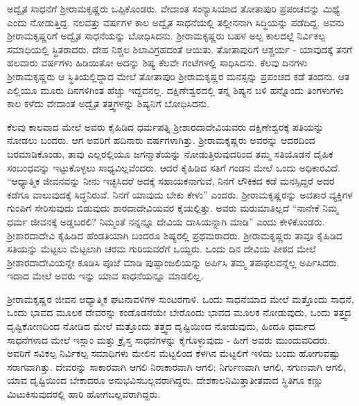 ಅದ್ವೈತ ಸಾಧನೆಗೆ ಶ‍್ರೀರಾಮಕೃಷ್ಣರು ಒಪ್ಪಿಕೊಂಡರು. ವೇದಾಂತ ಸಂನ್ಯಾಸಿಯಾದ ತೋತಾಪುರಿ ಪ್ರಪಂಚವನ್ನು ಮಿಥ್ಯೆ ಎಂದು ನೋಡುತ್ತಿದ್ದ. ನಲವತ್ತು ವರ್ಷಗಳ ಕಾಲ ಅದ್ವೈತ ಸಾಧನೆಯಲ್ಲಿ ತಲ್ಲೀನನಾಗಿ ಸಿದ್ಧಿಯನ್ನು ಪಡೆದಿದ್ದ. ಅವನು ಶ‍್ರೀರಾಮಕೃಷ್ಣರಿಗೆ ಅದ್ವೈತ ಸಾಧನೆಯನ್ನು ಬೋಧಿಸಿದನು. ಶ‍್ರೀರಾಮಕೃಷ್ಣರು ಬಹಳ ಅಲ್ಪ ಕಾಲದಲ್ಲೆ ನಿರ್ವಿಕಲ್ಪ ಸಮಾಧಿಯಲ್ಲಿ ಸ್ಥಿತರಾದರು. ದೇಹ ನಿಶ್ಚಲ ಶಿಲಾವಿಗ್ರಹದಂತೆ ಆಯಿತು. ತೋತಾಪುರಿಗೆ ಆಶ್ಚರ್ಯ - ಯಾವುದಕ್ಕೆ ತನಗೆ ಹಲವಾರು ವರ್ಷಗಳು ಹಿಡಿಯಿತೋ ಅದನ್ನು ಶಿಷ್ಯ ಕೆಲವೇ ಗಂಟೆಗಳಲ್ಲಿ ಸಾಧಿಸಿದನು. ಕೆಲವು ದಿನಗಳು ಶ‍್ರೀರಾಮಕೃಷ್ಣರು ಆ ಸ್ಥಿತಿಯಲ್ಲಿದ್ದಾದ ಮೇಲೆ ತೋತಾಪುರಿ ಶ‍್ರೀರಾಮಕೃಷ್ಣರ ಮನಸ್ಸನ್ನು ಪ್ರಪಂಚದ ಕಡೆ ತಂದನು. ಆತ ಎಲ್ಲಿಯೂ ಮೂರು ದಿನಗಳಿಗಿಂತ ಹೆಚ್ಚು ಇದ್ದವನಲ್ಲ. ದಕ್ಷಿಣೇಶ್ವರದಲ್ಲಿ ತನ್ನ ಶಿಷ್ಯನ ಬಳಿ ಹನ್ನೊಂದು ತಿಂಗಳುಗಳು ಕಾಲ ಕಳೆದು ವೇದಾಂತ ಅದ್ವೈತ ತತ್ತ್ವಗಳನ್ನು ಶಿಷ್ಯನಿಗೆ ಬೋಧಿಸಿದನು.

ಕೆಲವು ಕಾಲವಾದ ಮೇಲೆ ಅವರು ಕೈಹಿಡಿದ ಧರ್ಮಪತ್ನಿ ಶ‍್ರೀಶಾರದಾದೇವಿಯವರು ದಕ್ಷಿಣೇಶ್ವರಕ್ಕೆ ಪತಿಯನ್ನು ನೋಡಲು ಬಂದರು. ಆಗ ಅವರಿಗೆ ಹದಿನಾರು ವರ್ಷಗಳಾಗಿತ್ತು. ಶ‍್ರೀರಾಮಕೃಷ್ಣರು ಅವರನ್ನು ಆದರದಿಂದ ಬರಮಾಡಿಕೊಂಡು, ತಾವು ಎಲ್ಲರಲ್ಲಿಯೂ ಜಗನ್ಮಾತೆಯನ್ನು ನೋಡುತ್ತಿರುವುದರಿಂದ ತಮ್ಮ ಸತಿಯೊಡನೆ ದೈಹಿಕ ಸಂಬಂಧವನ್ನು ಇಟ್ಟುಕೊಳ್ಳಲು ಸಾಧ್ಯವಿಲ್ಲವೆಂದರು. ಆದರೆ ಕೈಹಿಡಿದ ಸತಿಗೆ ಗಂಡನ ಮೇಲೆ ಒಂದು ಅಧಿಕಾರವಿದೆ. “ಆಧ್ಯಾತ್ಮಿಕ ಜೀವನವನ್ನು ನೀನು ಇಚ್ಛಿಸಿದರೆ ಅದಕ್ಕೆ ಸಹಾಯಕನಾಗುವೆ, ನಿನಗೆ ಲೌಕಿಕದ ಕಡೆ ಮನಸ್ಸಿದ್ದರೆ ಅದರ ಕಡೆಗೂ ವಾಲುವುದಕ್ಕೆ ಸಿದ್ಧನಿರುವೆ. ನಿನಗೆ ಯಾವುದು ಬೇಕು ಕೇಳು” ಎಂದರು. ಶ‍್ರೀರಾಮಕೃಷ್ಣರನ್ನು ಅವತಾರ ವ್ಯಕ್ತಿಗಳ ಗುಂಪಿಗೆ ಸೇರಿಸುವುದು ಬಿಡುವುದು ಶಾರದಾದೇವಿಯವರ ಕೈಯಲ್ಲಿತ್ತು. ಅವರು ಮರುಮಾತಿಲ್ಲದೆ “ನಾನೇಕೆ ನಿಮ್ಮ ಧರ್ಮ ಜೀವನಕ್ಕೆ ಅಡ್ಡಬರಲಿ? ನಿಮ್ಮಂತೆ ನನ್ನನ್ನೂ ದೇವಿಯ ದಾಸಿಯನ್ನಾಗಿ ಮಾಡಿ” ಎಂದು ಕೇಳಿಕೊಂಡರು. ಶ‍್ರೀಶಾರದಾದೇವಿ ಕೈಹಿಡಿದ ಹೆಂಡತಿಯಾಗಿ ಬಂದರೂ ಶಿಷ್ಯರಲ್ಲಿ ಪ್ರಥಮರಾದರು. ಶ‍್ರೀರಾಮಕೃಷ್ಣರು ತಾವೂ ಕೈಹಿಡಿದ ಸತಿಯನ್ನು ಮೆಟ್ಟಲು ಮೆಟ್ಟಲಾಗಿ ಚರಮ ಗುರಿಯವರೆಗೆ ಒಯ್ದರು. ಒಂದು ದಿನ ದೇವಿಯ ಪೀಠದ ಮೇಲೆ ಶ‍್ರೀಶಾರದಾದೇವಿಯನ್ನೇ ಕೂಡಿಸಿ ಪೂಜೆ ಮಾಡಿ ಪುಷ್ಪಾಂಜಲಿಯನ್ನು ಅರ್ಪಿಸಿ ತಮ್ಮ ತಪಃಫಲವನ್ನೆಲ್ಲ ಅರ್ಪಿಸಿದರು. ಇದಾದ ಮೇಲೆ ಅವರು ಇನ್ನು ಯಾವ ಸಾಧನೆಯನ್ನೂ ಮಾಡಲಿಲ್ಲ.

ಶ‍್ರೀರಾಮಕೃಷ್ಣರ ಜೀವನ ಆಧ್ಯಾತ್ಮಿಕ ಘಟನಾವಳಿಗಳ ಸುಂಟರಗಾಳಿ. ಒಂದು ಸಾಧನೆಯಾದ ಮೇಲೆ ಮತ್ತೊಂದು ಸಾಧನೆ, ಒಂದು ಭಾವದ ಮೂಲಕ ದೇವರನ್ನು ಕಂಡೊಡನೆಯೇ ಬೇರೊಂದು ಭಾವದ ಮೂಲಕ ನೋಡುವುದು, ಒಂದು ತತ್ತ್ವದ ದೃಷ್ಟಿಕೋಣದಿಂದ ನೋಡಿದ ಮೇಲೆ ಮತ್ತೊಂದು ತತ್ತ್ವದ ದೃಷ್ಟಿಯಿಂದ ನೋಡುವುದು, ಹಿಂದೂ ಧರ್ಮದ ಸಾಧನೆಗಳಾದ ಮೇಲೆ ಇಸ್ಲಾಂ ಮತ್ತು ಕ್ರೈಸ್ತ ಸಾಧನೆಗಳನ್ನು ಕೈಗೊಳ್ಳುವುದು - ಹೀಗೆ ಅವರು ಮುಂದುವರಿದರು. ಅವರಿಗೆ ಸವಿಕಲ್ಪ ನಿರ್ವಿಕಲ್ಪ ಸಮಾಧಿಗಳು ಮೇಲಿನ ಮೆಟ್ಟಲಿಂದ ಕೆಳಗಿನ ಮೆಟ್ಟಲಿಗೆ ಇಳಿದು ಬಂದು ಹೋಗುವಷ್ಟು ಸರಾಗವಾಗಿತ್ತು. ದೇವರನ್ನು ಸಾಕಾರವಾಗಿ ಆಗಲಿ ನಿರಾಕಾರವಾಗಿ ಆಗಲಿ; ನಿರ್ಗುಣವಾಗಿ ಆಗಲಿ, ಸಗುಣವಾಗಿ ಆಗಲಿ, ಯಾವ ದೃಷ್ಟಿಯಿಂದ ಬೇಕಾದರೂ ಅನುಭವಿಸಬಲ್ಲವರಾಗಿದ್ದರು. ದೇಶಕಾಲನಿಮಿತ್ತಾತೀತವಾದ ಸ್ಥಿತಿಗೂ ಕಣ್ಣು ಮಿಟುಕಿಸುವುದರಲ್ಲಿ ಹಾರಿ ಹೋಗಬಲ್ಲವರಾಗಿದ್ದರು.

